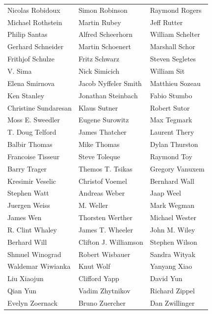 \begin{tabular}{lll}
Nicolas Robidoux       & Simon Robinson         & Raymond Rogers\\
Michael Rothstein      & Martin Rubey           & Jeff Rutter\\
Philip Santas          & Alfred Scheerhorn      & William Schelter\\
Gerhard Schneider      & Martin Schoenert       & Marshall Schor\\
Frithjof Schulze       & Fritz Schwarz          & Steven Segletes\\
V. Sima                & Nick Simicich          & William Sit\\
Elena Smirnova         & Jacob Nyffeler Smith   & Matthieu Sozeau\\
Ken Stanley            & Jonathan Steinbach     & Fabio Stumbo\\
Christine Sundaresan   & Klaus Sutner           & Robert Sutor\\
Moss E. Sweedler       & Eugene Surowitz        & Max Tegmark\\
T. Doug Telford        & James Thatcher         & Laurent Thery\\
Balbir Thomas          & Mike Thomas            & Dylan Thurston\\
Francoise Tisseur      & Steve Toleque          & Raymond Toy\\
Barry Trager           & Themos T. Tsikas       & Gregory Vanuxem\\
Kresimir Veselic       & Christof Voemel        & Bernhard Wall\\
Stephen Watt           & Andreas Weber          & Jaap Weel\\
Juergen Weiss          & M. Weller              & Mark Wegman\\
James Wen              & Thorsten Werther       & Michael Wester\\
R. Clint Whaley        & James T. Wheeler       & John M. Wiley\\
Berhard Will           & Clifton J. Williamson  & Stephen Wilson\\
Shmuel Winograd        & Robert Wisbauer        & Sandra Wityak\\
Waldemar Wiwianka      & Knut Wolf              & Yanyang Xiao\\
Liu Xiaojun            & Clifford Yapp          & David Yun\\
Qian Yun               & Vadim Zhytnikov        & Richard Zippel\\
Evelyn Zoernack        & Bruno Zuercher         & Dan Zwillinger\\
\end{tabular}
\newpage


